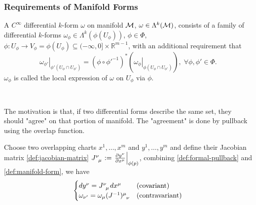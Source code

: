 \documentclass[../main.tex]{subfiles}
\begin{document}
    \subsubsection{Requirements of Manifold Forms}
    \begin{definition}\label{def:manifold-form}
        A \(C^\infty\) differential \(k\)-form \(\omega\) on manifold \(\manifold[M]\), 
        \(\omega \in \form{k}{M}\), consists of a family of 
        differential \(k\)-forms \(\omega_\phi \in \Lambda^k(\phi(U_\phi))\), 
        \(\phi \in \Phi\), \(\phi : U_\phi \to V_\phi = \phi(U_\phi) \subseteq 
        (-\infty, 0] \times \mathbb{R}^{m-1}\), with an additional requirement that 
        \[
        \left.\omega_{\phi'}\right|_{\phi'(U_\phi \cap U_{\phi'})}
        = \left(\phi\circ{\phi'} ^{-1}\right)^*\left(\left.\omega_\phi
        \right|_{\phi(U_\phi \cap U_{\phi'})}\right) ,\; \forall 
        \phi, \phi' \in \Phi.
        \]
        \(\omega_\phi\) is called the local expression of \(\omega\) on \(U_\phi\) 
        via \(\phi\).
    \end{definition}
    \begin{remark}\phantom{hehe}\\
        \begin{center}
            \centering
            \def\svgwidth{0.6\textwidth}
            
        \end{center}
        The motivation is that, if two differential forms describe the same set, 
        they should "agree" on that portion of manifold. The "agreement" is done by 
        pullback using the overlap function.
    \end{remark}
    \newpage
    \begin{theorem}\label{thm:form-covariancy}
        Choose two overlapping charts \(x^1, \dots, x^m\) and \(y^1, \dots, y^m\) 
        and define their Jacobian matrix \cref{def:jacobian-matrix} 
        \(J\indices{^\nu_\mu}:=\left.\frac{\partial y^\nu}{\partial x^\mu}\right|
        _{\phi(p)}\), combining \cref{def:formal-pullback} and 
        \cref{def:manifold-form}, we have 
        \[
        \begin{cases}
            dy^\nu = J\indices{^\nu_\mu}dx^\mu & (\text{covariant}) \\
            \omega_{\nu'} = \omega_{\mu}(J^{-1})\indices{^\mu_\nu} & 
            (\text{contravariant})
        \end{cases}
        \]
    \end{theorem}
\end{document}
